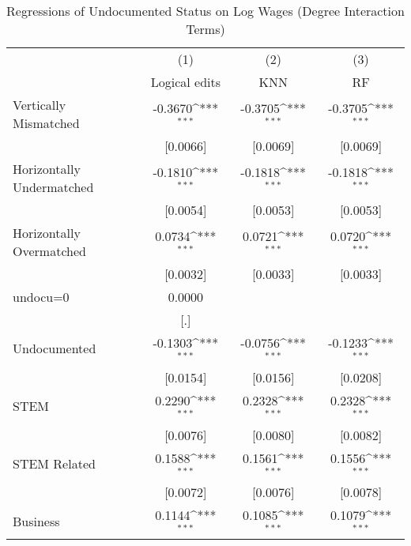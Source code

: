 \begin{table}[htbp]\centering
\def\sym#1{\ifmmode^{#1}\else\(^{#1}\)\fi}
\caption{Regressions of Undocumented Status on Log Wages (Degree Interaction Terms)}
\begin{tabular}{l*{3}{c}}
\toprule
                    &\multicolumn{1}{c}{(1)}         &\multicolumn{1}{c}{(2)}         &\multicolumn{1}{c}{(3)}         \\
                    &Logical edits         &         KNN         &          RF         \\
\midrule
Vertically Mismatched&     -0.3670\sym{***}&     -0.3705\sym{***}&     -0.3705\sym{***}\\
                    &    [0.0066]         &    [0.0069]         &    [0.0069]         \\
\addlinespace
Horizontally Undermatched&     -0.1810\sym{***}&     -0.1818\sym{***}&     -0.1818\sym{***}\\
                    &    [0.0054]         &    [0.0053]         &    [0.0053]         \\
\addlinespace
Horizontally Overmatched&      0.0734\sym{***}&      0.0721\sym{***}&      0.0720\sym{***}\\
                    &    [0.0032]         &    [0.0033]         &    [0.0033]         \\
\addlinespace
undocu=0            &      0.0000         &                     &                     \\
                    &         [.]         &                     &                     \\
\addlinespace
Undocumented        &     -0.1303\sym{***}&     -0.0756\sym{***}&     -0.1233\sym{***}\\
                    &    [0.0154]         &    [0.0156]         &    [0.0208]         \\
\addlinespace
STEM                &      0.2290\sym{***}&      0.2328\sym{***}&      0.2328\sym{***}\\
                    &    [0.0076]         &    [0.0080]         &    [0.0082]         \\
\addlinespace
STEM Related        &      0.1588\sym{***}&      0.1561\sym{***}&      0.1556\sym{***}\\
                    &    [0.0072]         &    [0.0076]         &    [0.0078]         \\
\addlinespace
Business            &      0.1144\sym{***}&      0.1085\sym{***}&      0.1079\sym{***}\\

\end{tabular}
\end{table}
